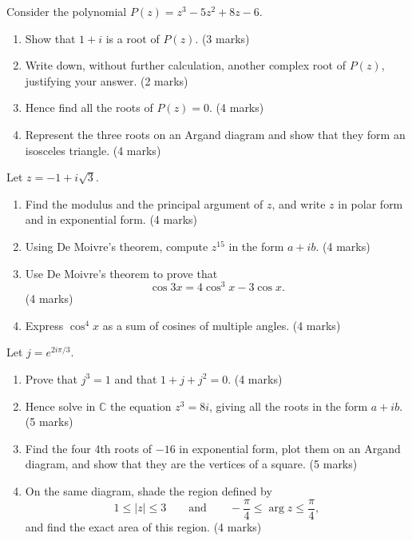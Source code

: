 \documentclass[11pt]{article}
\newcounter{popsec}
\newcounter{popsub}
\newcommand{\courssub}[1]{%
  \stepcounter{popsub}%
  \par\vspace{9pt}\noindent{\popxbold\fontsize{11.5}{13}\selectfont\color{popink}{\color{poporange}\thepopsec.\thepopsub}\hspace{6pt}#1}\par\nopagebreak\vspace{4pt}
}
\begin{document}
\courssub{I prepare for the GCE}

\begin{exercice}
Consider the polynomial $P(z) = z^3 - 5z^2 + 8z - 6$.
\begin{enumerate}
\item Show that $1 + i$ is a root of $P(z)$. \hfill (3 marks)
\item Write down, without further calculation, another complex root of $P(z)$, justifying your answer. \hfill (2 marks)
\item Hence find all the roots of $P(z) = 0$. \hfill (4 marks)
\item Represent the three roots on an Argand diagram and show that they form an isosceles triangle. \hfill (4 marks)
\end{enumerate}
\end{exercice}

\begin{exercice}
Let $z = -1 + i\sqrt{3}$.
\begin{enumerate}
\item Find the modulus and the principal argument of $z$, and write $z$ in polar form and in exponential form. \hfill (4 marks)
\item Using De Moivre's theorem, compute $z^{15}$ in the form $a + ib$. \hfill (4 marks)
\item Use De Moivre's theorem to prove that
\[ \cos 3x = 4\cos^3 x - 3\cos x. \] \hfill (4 marks)
\item Express $\cos^4 x$ as a sum of cosines of multiple angles. \hfill (4 marks)
\end{enumerate}
\end{exercice}

\begin{exercice}
Let $j = e^{2i\pi/3}$.
\begin{enumerate}
\item Prove that $j^3 = 1$ and that $1 + j + j^2 = 0$. \hfill (4 marks)
\item Hence solve in $\mathbb{C}$ the equation $z^3 = 8i$, giving all the roots in the form $a + ib$. \hfill (5 marks)
\item Find the four 4th roots of $-16$ in exponential form, plot them on an Argand diagram, and show that they are the vertices of a square. \hfill (5 marks)
\item On the same diagram, shade the region defined by
\[ 1 \leq |z| \leq 3 \qquad \text{and} \qquad -\frac{\pi}{4} \leq \arg z \leq \frac{\pi}{4}, \]
and find the exact area of this region. \hfill (4 marks)
\end{enumerate}
\end{exercice}
\end{document}
